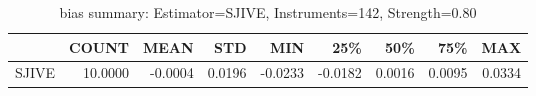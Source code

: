 \begin{table}[ht]
\centering
\caption{bias summary: Estimator=SJIVE, Instruments=142, Strength=0.80}
\begin{tabular}{lrrrrrrrr}
\toprule
 & COUNT & MEAN & STD & MIN & 25\% & 50\% & 75\% & MAX \\
\midrule
SJIVE & 10.0000 & -0.0004 & 0.0196 & -0.0233 & -0.0182 & 0.0016 & 0.0095 & 0.0334 \\
\bottomrule
\end{tabular}
\end{table}
